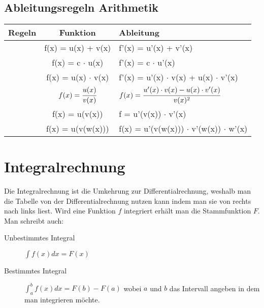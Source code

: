 \documentclass[a4paper]{scrartcl}
\begin{document}
        \subsection{Ableitungsregeln Arithmetik}
                \begin{tabular}{|c|c|M|}
                    \hline
                    \textbf{Regeln}  & \textbf{Funktion} & \textbf{Ableitung}  \\
                    \hline
                    \hline
                        & f(x) = u(x) + v(x) & f'(x) = u'(x) + v'(x) \\
                    \hline
                        & f(x) = c  $\cdot$  u(x) & f'(x) = c  $\cdot$  u'(x) \\
                    \hline
                        & f(x) = u(x)  $\cdot$  v(x) & f'(x) = u'(x)  $\cdot$  v(x) + u(x)  $\cdot$  v'(x) \\
                    \hline
                        &  $f(x) = \cfrac{u(x)}{v(x)}$ & $f(x) = \cfrac{ u'(x)  \cdot  v(x) - u(x)  \cdot  v'(x)}{v(x)^2}$   \\
                    \hline
                        & f(x) = u(v(x)) & f = u'(v(x))  $\cdot$  v'(x) \\
                    \hline
                        & f(x) = u(v(w(x))) & f(x) = u'(v(w(x))) $\cdot$ v'(w(x)) $\cdot$ w'(x) \\
                    \hline
                \end{tabular}
                
    \section{Integralrechnung}
        Die Integralrechnung ist die Umkehrung zur Differentialrechnung, weshalb man die Tabelle von der Differentialrechnung nutzen kann indem man sie von rechts nach links liest.
        Wird eine Funktion $f$ integriert erhält man die Stammfunktion $F$. Man schreibt auch:
        \begin{description}
            \item[Unbestimmtes Integral] $\int f(x) dx = F(x)$
            \item[Bestimmtes Integral] $\int_{a}^{b} f(x) dx = F(b) - F(a)$  wobei $a$ und $b$ das Intervall angeben in dem man integrieren möchte. 
        \end{description}
\end{document}
